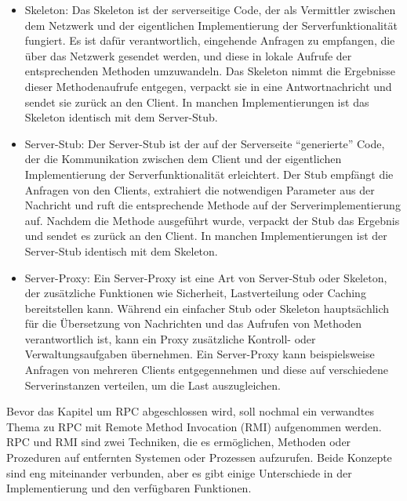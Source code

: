 \begin{itemize} 
\item Skeleton: Das Skeleton ist der serverseitige Code, der als Vermittler zwischen dem Netzwerk und der eigentlichen Implementierung der Serverfunktionalität fungiert. Es ist dafür verantwortlich, eingehende Anfragen zu empfangen, die über das Netzwerk gesendet werden, und diese in lokale Aufrufe der entsprechenden Methoden umzuwandeln. Das Skeleton nimmt die Ergebnisse dieser Methodenaufrufe entgegen, verpackt sie in eine Antwortnachricht und sendet sie zurück an den Client. In manchen Implementierungen ist das Skeleton identisch mit dem Server-Stub.
\item Server-Stub: Der Server-Stub ist der auf der Serverseite \enquote{generierte} Code, der die Kommunikation zwischen dem Client und der eigentlichen Implementierung der Serverfunktionalität erleichtert. Der Stub empfängt die Anfragen von den Clients, extrahiert die notwendigen Parameter aus der Nachricht und ruft die entsprechende Methode auf der Serverimplementierung auf. Nachdem die Methode ausgeführt wurde, verpackt der Stub das Ergebnis und sendet es zurück an den Client. In manchen Implementierungen ist der Server-Stub identisch mit dem Skeleton.
\item Server-Proxy: Ein Server-Proxy ist eine Art von Server-Stub oder Skeleton, der zusätzliche Funktionen wie Sicherheit, Lastverteilung oder Caching bereitstellen kann. Während ein einfacher Stub oder Skeleton hauptsächlich für die Übersetzung von Nachrichten und das Aufrufen von Methoden verantwortlich ist, kann ein Proxy zusätzliche Kontroll- oder Verwaltungsaufgaben übernehmen. Ein Server-Proxy kann beispielsweise Anfragen von mehreren Clients entgegennehmen und diese auf verschiedene Serverinstanzen verteilen, um die Last auszugleichen.
\end{itemize} 

Bevor das Kapitel um RPC abgeschlossen wird, soll nochmal ein verwandtes Thema zu RPC mit Remote Method Invocation (RMI)  aufgenommen werden. RPC und RMI sind zwei Techniken, die es ermöglichen, Methoden oder Prozeduren auf entfernten Systemen oder Prozessen aufzurufen. Beide Konzepte sind eng miteinander verbunden, aber es gibt einige Unterschiede in der Implementierung und den verfügbaren Funktionen.

